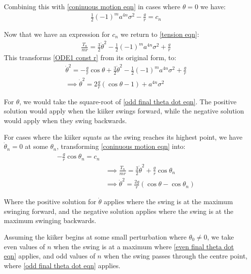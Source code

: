 \documentclass[12pt]{article}
\begin{document}
Combining this with \ref{coninuous motion eqn} in cases where $\theta = 0$ we have:
\begin{align}
    \frac{1}{2}(-1)^{m}a^{4n}\sigma^2 - \frac{g}{r} = c_n
\end{align}

Now that we have an expression for $c_n$ we return to \ref{tension eqn}:
\begin{align}
    \frac{T_n}{mr} = \frac{3}{2}\dot{\theta}^2 - \frac{1}{2}(-1)^{m}a^{4n}\sigma^2 + \frac{g}{r}
\end{align}
This transforms \ref{ODE1 const r} from its original form, to:
\begin{align}
    \dot{\theta}^2 = -\frac{g}{r}\cos{\theta} + \frac{3}{2}\dot{\theta}^2 - \frac{1}{2}(-1)^{m}a^{4n}\sigma^2 + \frac{g}{r}
    \\\implies\dot{\theta}^2 = 2\frac{g}{r}(\cos{\theta}-1) +a^{4n}\sigma^2 
    \label{odd final theta dot eqn}
\end{align}

For $\theta$, we would take the square-root of \ref{odd final theta dot eqn}. The positive solution would apply when the kiiker swings forward, while the negative solution would apply when they swing backwards.

For cases where the kiiker squats as the swing reaches its highest point, we have $\dot{\theta}_n = 0$ at some $\theta_n$, transforming \ref{coninuous motion eqn} into:
\begin{align}
    -\frac{g}{r}\cos{\theta_n} = c_n
    \\&\implies \frac{T_n}{mr} = \frac{3}{2}\dot{\theta}^2 + \frac{g}{r}\cos{\theta_n}
    \\&\implies \dot{\theta}^2 = \frac{2g}{r}(\cos{\theta}-\cos{\theta_n})
    \label{even final theta dot eqn}
\end{align}

Where the positive solution for $\dot{\theta}$ applies where the swing is at the maximum swinging forward, and the negative solution applies where the swing is at the maximum swinging backwards.

Assuming the kiiker begins at some small perturbation where $\theta_0 \neq 0$, we take even values of $n$ when the swing is at a maximum where \ref{even final theta dot eqn} applies, and odd values of $n$ when the swing passes through the centre point, where \ref{odd final theta dot eqn} applies.
\end{document}
